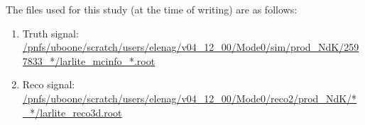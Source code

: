 \documentclass[a4paper, 10pt]{article}
\begin{document}
The files used for this study (at the time of writing) are as follows:
\begin{enumerate}[topsep=10pt,itemsep=-1ex,partopsep=10pt,parsep=1ex]
\item Truth signal: \url{/pnfs/uboone/scratch/users/elenag/v04_12_00/Mode0/sim/prod_NdK/2597833_*/larlite_mcinfo_*.root}
\item Reco signal: \url{/pnfs/uboone/scratch/users/elenag/v04_12_00/Mode0/reco2/prod_NdK/*_*/larlite_reco3d.root}
\end{enumerate}


\end{document}
